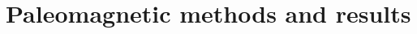 \documentclass[draft]{agujournal2019}
\begin{document}




\section*{Paleomagnetic methods and results}
\end{document}
